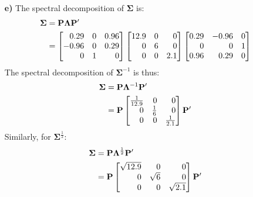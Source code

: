 \begin{enumerate}
\item[\bf{e)}]
	The spectral decomposition of $\mathbf{\Sigma}$ is:
	\begin{align*}
		\mathbf{\Sigma} &= \mf{P} \mathbf{\Lambda} \mf{P}'\\
										&= \m{0.29&0&0.96\\-0.96&0&0.29\\0&1&0} \m{12.9&0&0\\0&6&0\\0&0&2.1} \m{0.29&-0.96&0\\0&0&1\\0.96&0.29&0}
	\end{align*}	
	The spectral decomposition of $\mathbf{\Sigma}^{-1}$ is thus:
	\begin{align*}
		\mathbf{\Sigma} &= \mf{P} \mathbf{\Lambda}^{-1} \mf{P}' \\
										&= \mf{P} \m{\frac{1}{12.9}&0&0\\0&\frac{1}{6}&0\\0&0&\frac{1}{2.1}} \mf{P}'
	\end{align*}	
	Similarly, for $\mathbf{\Sigma}^{\frac{1}{2}}$:
	\begin{align*}
		\mathbf{\Sigma} &= \mf{P} \mathbf{\Lambda}^{\frac{1}{2}} \mf{P}' \\
										&= \mf{P} \m{\sqrt{12.9}&0&0\\0&\sqrt{6}&0\\0&0&\sqrt{2.1}} \mf{P}'
	\end{align*}	

\end{enumerate}

\newpage
